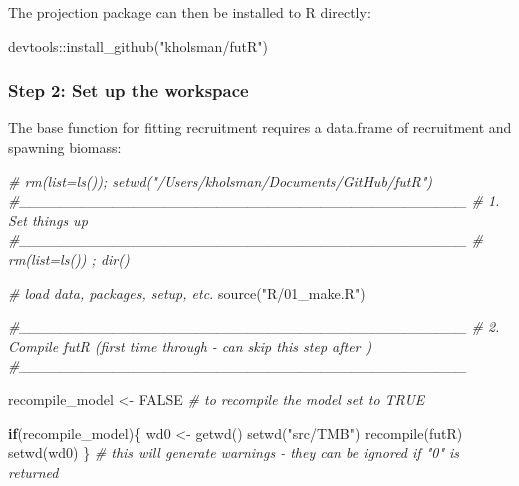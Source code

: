 \documentclass[
]{article}
\newenvironment{Shaded}{\begin{snugshade}}{\end{snugshade}}
\newcommand{\CommentTok}[1]{\textcolor[rgb]{0.56,0.35,0.01}{\textit{#1}}}
\newcommand{\ConstantTok}[1]{\textcolor[rgb]{0.00,0.00,0.00}{#1}}
\newcommand{\ControlFlowTok}[1]{\textcolor[rgb]{0.13,0.29,0.53}{\textbf{#1}}}
\newcommand{\FunctionTok}[1]{\textcolor[rgb]{0.00,0.00,0.00}{#1}}
\newcommand{\NormalTok}[1]{#1}
\newcommand{\OtherTok}[1]{\textcolor[rgb]{0.56,0.35,0.01}{#1}}
\newcommand{\SpecialCharTok}[1]{\textcolor[rgb]{0.00,0.00,0.00}{#1}}
\newcommand{\StringTok}[1]{\textcolor[rgb]{0.31,0.60,0.02}{#1}}
\begin{document}
The projection package can then be installed to R directly:

\begin{Shaded}
\begin{Highlighting}[]
\NormalTok{devtools}\SpecialCharTok{::}\FunctionTok{install\_github}\NormalTok{(}\StringTok{"kholsman/futR"}\NormalTok{)}
\end{Highlighting}
\end{Shaded}

\hypertarget{step-2-set-up-the-workspace}{%
\subsubsection{Step 2: Set up the
workspace}\label{step-2-set-up-the-workspace}}

The base function for fitting recruitment requires a data.frame of
recruitment and spawning biomass:

\begin{Shaded}
\begin{Highlighting}[]
  \CommentTok{\# rm(list=ls()); setwd("/Users/kholsman/Documents/GitHub/futR")}
  \CommentTok{\#\_\_\_\_\_\_\_\_\_\_\_\_\_\_\_\_\_\_\_\_\_\_\_\_\_\_\_\_\_\_\_\_\_\_\_\_\_\_\_\_\_\_\_}
  \CommentTok{\# 1. Set things up}
  \CommentTok{\#\_\_\_\_\_\_\_\_\_\_\_\_\_\_\_\_\_\_\_\_\_\_\_\_\_\_\_\_\_\_\_\_\_\_\_\_\_\_\_\_\_\_\_}
  \CommentTok{\# rm(list=ls()) ; dir()}

  \CommentTok{\# load data, packages, setup, etc.}
  \FunctionTok{source}\NormalTok{(}\StringTok{"R/01\_make.R"}\NormalTok{)}

  \CommentTok{\#\_\_\_\_\_\_\_\_\_\_\_\_\_\_\_\_\_\_\_\_\_\_\_\_\_\_\_\_\_\_\_\_\_\_\_\_\_\_\_\_\_\_\_}
  \CommentTok{\# 2. Compile futR (first time through {-} can skip this step after )}
  \CommentTok{\#\_\_\_\_\_\_\_\_\_\_\_\_\_\_\_\_\_\_\_\_\_\_\_\_\_\_\_\_\_\_\_\_\_\_\_\_\_\_\_\_\_\_\_}

\NormalTok{  recompile\_model }\OtherTok{\textless{}{-}} \ConstantTok{FALSE} \CommentTok{\# to recompile the model set to TRUE}

   \ControlFlowTok{if}\NormalTok{(recompile\_model)\{}
\NormalTok{    wd0 }\OtherTok{\textless{}{-}} \FunctionTok{getwd}\NormalTok{()}
    \FunctionTok{setwd}\NormalTok{(}\StringTok{"src/TMB"}\NormalTok{)}
      \FunctionTok{recompile}\NormalTok{(}\StringTok{\textquotesingle{}futR\textquotesingle{}}\NormalTok{)}
    \FunctionTok{setwd}\NormalTok{(wd0)}
\NormalTok{   \}}
  \CommentTok{\# this will generate warnings {-} they can be ignored if "0" is returned}
\end{Highlighting}
\end{Shaded}
\end{document}
